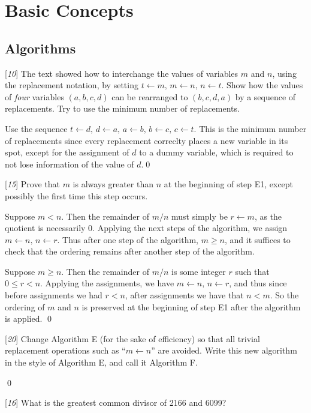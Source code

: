 \chapter{Basic Concepts}
\section{Algorithms}

 [\textit{10}] The text showed how to interchange the values of variables $m$ and $n$, using the replacement notation, by setting $t \leftarrow m, \, m \leftarrow n, \, n \leftarrow t$. Show how the values of \textit{four} variables $(a, b, c, d)$ can be rearranged to $(b, c, d, a)$ by a sequence of replacements. Try to use the minimum number of replacements.

\sol Use the sequence $t \leftarrow d, \, d \leftarrow a, \, a \leftarrow b, \, b \leftarrow c, \, c \leftarrow t$. This is the minimum number of replacements since every replacement correclty places a new variable in its spot, except for the assignment of $d$ to a dummy variable, which is required to not lose information of the value of $d$.\qed

 [\textit{15}] Prove that $m$ is always greater than $n$ at the beginning of step E1, except possibly the first time this step occurs.

\pf Suppose $m < n$. Then the remainder of $m / n$ must simply be $r \leftarrow m$, as the quotient is necessarily 0. Applying the next steps of the algorithm, we assign $m \leftarrow n, \, n \leftarrow r$. Thus after one step of the algorithm, $m \geq n$, and it suffices to check that the ordering remains after another step of the algorithm.

Suppose $m \geq n$. Then the remainder of $m / n$ is some integer $r$ such that $0 \leq r < n$. Applying the assignments, we have $m \leftarrow n, \, n \leftarrow r$, and thus since before assignments we had $r < n$, after assignments we have that $n < m$. So the ordering of $m$ and $n$ is preserved at the beginning of step E1 after the algorithm is applied. \qed

 [\textit{20}] Change Algorithm E (for the sake of efficiency) so that all trivial replacement operations such as ``$m \leftarrow n$'' are avoided. Write this new algorithm in the style of Algorithm E, and call it Algorithm F.

\sol \qed

 [\textit{16}] What is the greatest common divisor of 2166 and 6099?

